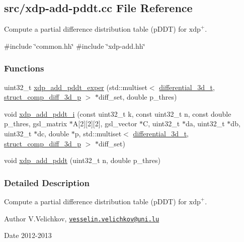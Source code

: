 \hypertarget{xdp-add-pddt_8cc}{\subsection{src/xdp-\/add-\/pddt.cc \-File \-Reference}
\label{xdp-add-pddt_8cc}
}


\-Compute a partial difference distribution table (p\-D\-D\-T) for $\mathrm{xdp}^{+}$.  


{\ttfamily \#include \char`\"{}common.\-hh\char`\"{}}\*
{\ttfamily \#include \char`\"{}xdp-\/add.\-hh\char`\"{}}\*
\subsubsection*{\-Functions}
\begin{DoxyCompactItemize}
\item 
uint32\-\_\-t \hyperlink{xdp-add-pddt_8cc_a04cd5582472cde3ab474d6c3d1de11a4}{xdp\-\_\-add\-\_\-pddt\-\_\-exper} (std\-::multiset$<$ \hyperlink{structdifferential__3d__t}{differential\-\_\-3d\-\_\-t}, \hyperlink{structstruct__comp__diff__3d__p}{struct\-\_\-comp\-\_\-diff\-\_\-3d\-\_\-p} $>$ $\ast$diff\-\_\-set, double p\-\_\-thres)
\item 
void \hyperlink{xdp-add-pddt_8cc_a9a024b72abb61a8fca140574fa1027e2}{xdp\-\_\-add\-\_\-pddt\-\_\-i} (const uint32\-\_\-t k, const uint32\-\_\-t n, const double p\-\_\-thres, gsl\-\_\-matrix $\ast$\-A\mbox{[}2\mbox{]}\mbox{[}2\mbox{]}\mbox{[}2\mbox{]}, gsl\-\_\-vector $\ast$\-C, uint32\-\_\-t $\ast$da, uint32\-\_\-t $\ast$db, uint32\-\_\-t $\ast$dc, double $\ast$p, std\-::multiset$<$ \hyperlink{structdifferential__3d__t}{differential\-\_\-3d\-\_\-t}, \hyperlink{structstruct__comp__diff__3d__p}{struct\-\_\-comp\-\_\-diff\-\_\-3d\-\_\-p} $>$ $\ast$diff\-\_\-set)
\item 
void \hyperlink{xdp-add-pddt_8cc_aa503d442ec118773fc9d2a653c8a1915}{xdp\-\_\-add\-\_\-pddt} (uint32\-\_\-t n, double p\-\_\-thres)
\end{DoxyCompactItemize}


\subsubsection{\-Detailed \-Description}
\-Compute a partial difference distribution table (p\-D\-D\-T) for $\mathrm{xdp}^{+}$. \begin{DoxyAuthor}{\-Author}
\-V.\-Velichkov, \href{mailto:vesselin.velichkov@uni.lu}{\tt vesselin.\-velichkov@uni.\-lu} 
\end{DoxyAuthor}
\begin{DoxyDate}{\-Date}
2012-\/2013 
\end{DoxyDate}


